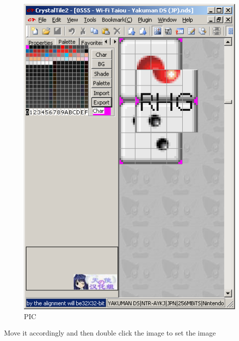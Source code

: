 \documentclass[
]{book}
\begin{document}
\begin{figure}
\centering
\includegraphics{images/28_home_fast6191_romhackingguide_unrenamed_file____borders_romhackingguidecrystaltile2export3.png}
\caption{PIC}
\end{figure}

Move it accordingly and then double click the image to set the image
\end{document}
